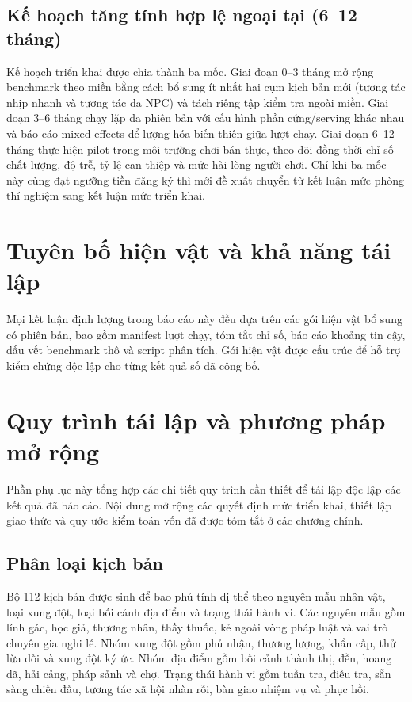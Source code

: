 ﻿\documentclass[a4paper,12pt]{article}
\renewcommand{\thesection}{\arabic{section}}
\begin{document}
\subsection{Kế hoạch tăng tính hợp lệ ngoại tại (6--12 tháng)}
Kế hoạch triển khai được chia thành ba mốc. Giai đoạn 0--3 tháng mở rộng benchmark theo miền bằng cách bổ sung ít nhất hai cụm kịch bản mới (tương tác nhịp nhanh và tương tác đa NPC) và tách riêng tập kiểm tra ngoài miền. Giai đoạn 3--6 tháng chạy lặp đa phiên bản với cấu hình phần cứng/serving khác nhau và báo cáo mixed-effects để lượng hóa biến thiên giữa lượt chạy. Giai đoạn 6--12 tháng thực hiện pilot trong môi trường chơi bán thực, theo dõi đồng thời chỉ số chất lượng, độ trễ, tỷ lệ can thiệp và mức hài lòng người chơi. Chỉ khi ba mốc này cùng đạt ngưỡng tiền đăng ký thì mới đề xuất chuyển từ kết luận mức phòng thí nghiệm sang kết luận mức triển khai.

\section*{Tuyên bố hiện vật và khả năng tái lập}
Mọi kết luận định lượng trong báo cáo này đều dựa trên các gói hiện vật bổ sung có phiên bản, bao gồm manifest lượt chạy, tóm tắt chỉ số, báo cáo khoảng tin cậy, dấu vết benchmark thô và script phân tích. Gói hiện vật được cấu trúc để hỗ trợ kiểm chứng độc lập cho từng kết quả số đã công bố.

\appendix
\titleformat{\section}{\bfseries\fontsize{15}{20}\selectfont}{Phụ lục \thesection:}{0.6em}{}

\section{Quy trình tái lập và phương pháp mở rộng}
Phần phụ lục này tổng hợp các chi tiết quy trình cần thiết để tái lập độc lập các kết quả đã báo cáo. Nội dung mở rộng các quyết định mức triển khai, thiết lập giao thức và quy ước kiểm toán vốn đã được tóm tắt ở các chương chính.

\subsection{Phân loại kịch bản}
Bộ 112 kịch bản được sinh để bao phủ tính dị thể theo nguyên mẫu nhân vật, loại xung đột, loại bối cảnh địa điểm và trạng thái hành vi. Các nguyên mẫu gồm lính gác, học giả, thương nhân, thầy thuốc, kẻ ngoài vòng pháp luật và vai trò chuyên gia nghi lễ. Nhóm xung đột gồm phủ nhận, thương lượng, khẩn cấp, thử lừa dối và xung đột ký ức. Nhóm địa điểm gồm bối cảnh thành thị, đền, hoang dã, hải cảng, pháp sảnh và chợ. Trạng thái hành vi gồm tuần tra, điều tra, sẵn sàng chiến đấu, tương tác xã hội nhàn rỗi, bàn giao nhiệm vụ và phục hồi.
\end{document}

